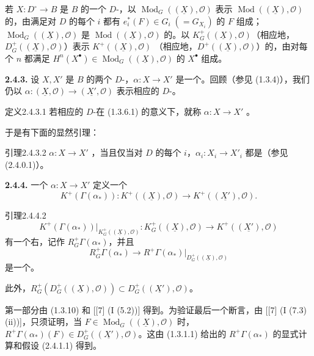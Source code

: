 若 $X:D^\circ\to B$ 是 $B$ 的一个 $D$-，以 $\operatorname{Mod}_G((\underline X),\mathcal O)$ 表示 $\operatorname{Mod}((\underline X),\mathcal O)$ 的，由满足对 $D$ 的每个 $i$ 都有 $e_i^*(F)\in G_i\;(=G_{X_i})$ 的 $F$ 组成；$\operatorname{Mod}_G((\underline X),\mathcal O)$ 是 $\operatorname{Mod}((\underline X),\mathcal O)$ 的。以 $K^+_G((\underline X),\mathcal O)$（相应地，$D^+_G((\underline X),\mathcal O)$）表示 $K^+((\underline X),\mathcal O)$
（相应地，$D^+((\underline X),\mathcal O)$）的，由对每个 $n$ 都满足 $H^n(X^\bullet)\in\operatorname{Mod}_G((\underline X),\mathcal O)$ 的 $X^\bullet$ 组成。

\textbf{2.4.3.} 设 $X,X'$ 是 $B$ 的两个 $D$-，$\alpha:X\to X'$ 是一个。回顾（参见 (1.3.4)），我们仍以 $\alpha:(\underline X,\mathcal O)\to(\underline{X'},\mathcal O)$ 表示相应的 $D$-。

\begin{SGAresult}{定义}{2.4.3.1}
若相应的 $D$-在 (1.3.6.1) 的意义下，就称 $\alpha:X\to X'$ 。
\end{SGAresult}
于是有下面的显然引理：
\begin{SGAresult}{引理}{2.4.3.2}
$\alpha:X\to X'$ ，当且仅当对 $D$ 的每个 $i$，$\alpha_i:X_i\to X'_i$ 都是（参见 (2.4.0.1)）。
\end{SGAresult}
\textbf{2.4.4.} 一个 $\alpha:X\to X'$ 定义一个
\[
K^+(\Gamma(\alpha_*)):K^+((\underline X),\mathcal O)
\longrightarrow K^+((\underline{X'}),\mathcal O). \tag{2.4.4.1}
\]
\begin{SGAresult}{引理}{2.4.4.2}
\[
K^+(\Gamma(\alpha_*))\big|_{K^+_G((\underline X),\mathcal O)}:
K^+_G((\underline X),\mathcal O)\longrightarrow K^+((\underline{X'}),\mathcal O)
\]
有一个右，记作 $R^+_G\Gamma(\alpha_*)$，并且
\[
R^+_G\Gamma(\alpha_*)\longrightarrow
R^+\Gamma(\alpha_*)\big|_{D^+_G((\underline X),\mathcal O)}
\]
是一个。

此外，$R^+_G(D^+_G((\underline X),\mathcal O))\subset D^+_G((\underline{X'}),\mathcal O)$。
\end{SGAresult}
第一部分由 (1.3.10) 和 [[7] (I (5.2))] 得到。为验证最后一个断言，由 [[7] (I (7.3) (ii))]，只须证明，当 $F\in\operatorname{Mod}_G((\underline X),\mathcal O)$ 时，$R^+\Gamma(\alpha_*)(F)\in D^+_G((\underline{X'}),\mathcal O)$。这由 (1.3.1.1) 给出的 $R^+\Gamma(\alpha_*)$ 的显式计算和假设 (2.4.1.1) 得到。

